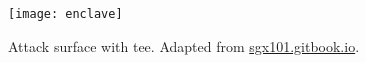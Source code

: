 \begin{figure}[!ht]
	\centering
	\texttt{[image: enclave]}
	\caption{
		Attack surface with \acrshort{tee}.
		Adapted from \url{sgx101.gitbook.io}.
	}%
	\label{figure:enclave}
\end{figure}
